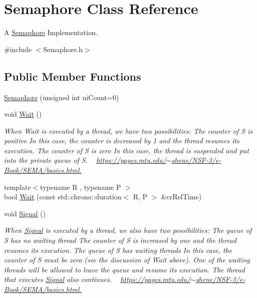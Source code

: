 \hypertarget{class_semaphore}{}\section{Semaphore Class Reference}
\label{class_semaphore}


A \hyperlink{class_semaphore}{Semaphore} Implementation.  




{\ttfamily \#include $<$Semaphore.\+h$>$}

\subsection*{Public Member Functions}
\begin{DoxyCompactItemize}
\item 
\hyperlink{class_semaphore_a0d9290d316636875ca85d1d78950a817}{Semaphore} (unsigned int ui\+Count=0)
\item 
void \hyperlink{class_semaphore_a72aabebf026e3a8b1f3e4d0fa8ee1eda}{Wait} ()
\begin{DoxyCompactList}\small\item\em When Wait is executed by a thread, we have two possibilities\+: The counter of S is positive In this case, the counter is decreased by 1 and the thread resumes its execution. The counter of S is zero In this case, the thread is suspended and put into the private queue of S. ~\newline
\hyperlink{}{https\+://pages.\+mtu.\+edu/$\sim$shene/\+N\+S\+F-\/3/e-\/\+Book/\+S\+E\+M\+A/basics.\+html.}\end{DoxyCompactList}\item 
{\footnotesize template$<$typename R , typename P $>$ }\\bool \hyperlink{class_semaphore_a7f700173ae86ae623684109066e07656}{Wait} (const std\+::chrono\+::duration$<$ R, P $>$ \&cr\+Rel\+Time)
\item 
void \hyperlink{class_semaphore_a86f92f738b4486439b296d8e235895f2}{Signal} ()
\begin{DoxyCompactList}\small\item\em When \hyperlink{class_signal}{Signal} is executed by a thread, we also have two possibilities\+: The queue of S has no waiting thread The counter of S is increased by one and the thread resumes its execution. The queue of S has waiting threads In this case, the counter of S must be zero (see the discussion of Wait above). One of the waiting threads will be allowed to leave the queue and resume its execution. The thread that executes \hyperlink{class_signal}{Signal} also continues. ~\newline
\hyperlink{}{https\+://pages.\+mtu.\+edu/$\sim$shene/\+N\+S\+F-\/3/e-\/\+Book/\+S\+E\+M\+A/basics.\+html.}\end{DoxyCompactList}\end{DoxyCompactItemize}


